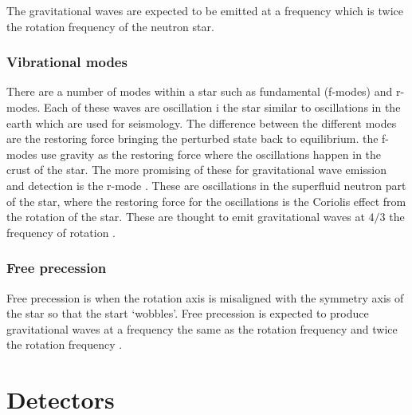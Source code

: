 The gravitational waves are expected to be emitted at a frequency which is twice the rotation frequency of the neutron star.
 
 \subsubsection{Vibrational modes}
There are a number of modes within a star such as fundamental (f-modes) and r-modes. 
Each of these waves are oscillation i the star similar to oscillations in the earth which are used for seismology.
The difference between the different modes are the restoring force bringing the perturbed state back to equilibrium.
the f-modes use gravity as the restoring force where the oscillations happen in the crust of the star.
The more promising of these for gravitational wave emission and detection is the r-mode \cite{Becker2009}.
These are oscillations in the superfluid neutron part of the star,
where the restoring force for the oscillations is the Coriolis effect from the rotation of the star.
These are thought to emit gravitational waves at $4/3$ the frequency of rotation \cite{Becker2009}.

\subsubsection{Free precession}

Free precession is when the rotation axis is misaligned with the symmetry axis of the star so that the start `wobbles'. 
Free precession is expected to produce gravitational waves at a frequency the same as the rotation frequency and twice the rotation frequency \cite{Becker2009}. 


\section{\label{intro:detector}Detectors}

